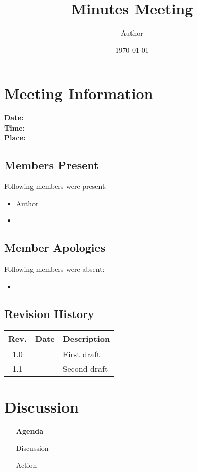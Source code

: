 \documentclass[a4paper,11pt]{article}
\newcounter{magicrownumbers}
\newcommand \nextnumber{\stepcounter{magicrownumbers}\arabic{magicrownumbers}} %
\begin{document}
\title{Minutes Meeting}
\author{Author}
\date{\today}

\maketitle	
\section{Meeting Information}
			\textbf{Date:} \\
			\textbf{Time:} \\
			\textbf{Place:}\\
	\subsection{Members Present}
Following members were present:
			\begin{itemize}
				\item Author 
				\item
			\end{itemize}
		\subsection{Member Apologies}
Following members were absent:
				\begin{itemize}
				\item 
				\end{itemize}
		
	\subsection{Revision History}
			\begin{tabular}{c | l | l }
				\textbf{Rev.} & \textbf{Date} & \textbf{Description} \\
				\hline
				1.0 &  & First draft\\
				1.1 & & Second draft \\
				

			\end{tabular}		

\newpage
\section{Discussion}
\setcounter{magicrownumbers}{0} %
\begin{itemize}
	\item [\textbf{Agenda \nextnumber}]  
	\item [Discussion]
	\item [Action]
\end{itemize}
\end{document}
